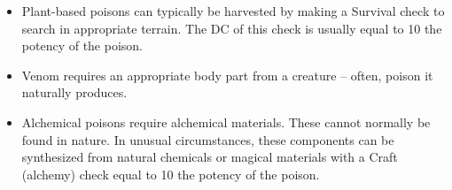 \begin{itemize}
    \item {} Plant-based poisons can typically be harvested by making a Survival check to search in appropriate terrain.
        The DC of this check is usually equal to 10 \add the potency of the poison.
    \item {} Venom requires an appropriate body part from a creature -- often, poison it naturally produces.
    \item {} Alchemical poisons require alchemical materials.
        These cannot normally be found in nature.
        In unusual circumstances, these components can be synthesized from natural chemicals or magical materials with a Craft (alchemy) check equal to 10 \add the potency of the poison.
\end{itemize}
